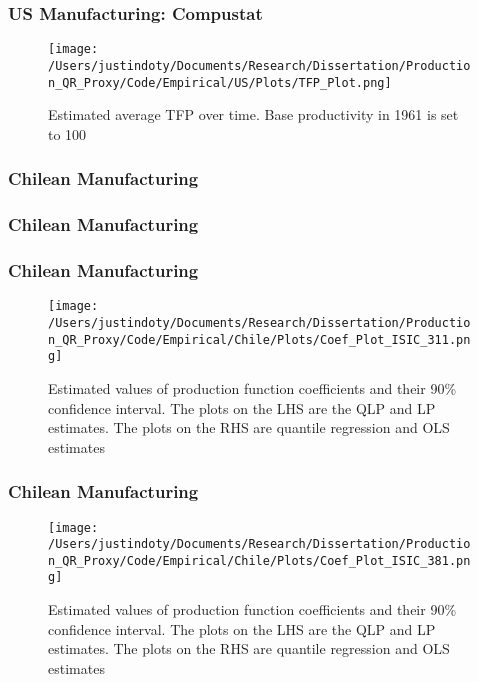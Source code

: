 \documentclass{beamer}
\begin{document}
\begin{frame}
\frametitle{US Manufacturing: Compustat}
\begin{figure}[ht]
\centering
\texttt{[image: /Users/justindoty/Documents/Research/Dissertation/Production\_QR\_Proxy/Code/Empirical/US/Plots/TFP\_Plot.png]}
\caption{Estimated average TFP over time. Base productivity in 1961 is set to 100}
\end{figure}
\end{frame}


\begin{frame}
\frametitle{Chilean Manufacturing}
\scriptsize

\end{frame}

\begin{frame}
\frametitle{Chilean Manufacturing}
\scriptsize

\end{frame}

\begin{frame}
\frametitle{Chilean Manufacturing}
\begin{figure}[ht]
\centering
\texttt{[image: /Users/justindoty/Documents/Research/Dissertation/Production\_QR\_Proxy/Code/Empirical/Chile/Plots/Coef\_Plot\_ISIC\_311.png]}
\caption{Estimated values of production function coefficients and their 90\% confidence interval. The plots on the LHS are the QLP and LP estimates. The plots on the RHS are quantile regression and OLS estimates}
\end{figure}
\end{frame}

\begin{frame}
\frametitle{Chilean Manufacturing}
\begin{figure}[ht]
\centering
\texttt{[image: /Users/justindoty/Documents/Research/Dissertation/Production\_QR\_Proxy/Code/Empirical/Chile/Plots/Coef\_Plot\_ISIC\_381.png]}
\caption{Estimated values of production function coefficients and their 90\% confidence interval. The plots on the LHS are the QLP and LP estimates. The plots on the RHS are quantile regression and OLS estimates}
\end{figure}
\end{frame}
\end{document}
